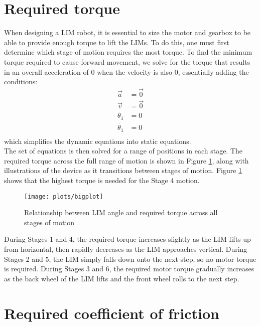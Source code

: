 \section{Required torque}
When designing a LIM robot, it is essential to size the motor and gearbox to be able to provide enough torque to lift the LIMs. To do this, one must first determine which stage of motion requires the most torque. To find the minimum torque required to cause forward movement, we solve for the torque that results in an overall acceleration of 0 when the velocity is also 0, essentially adding the conditions:
\begin{subequations}
	\label{condition-static}
	\begin{align}
		\vec{a} &= \vec{0}\\
		\vec{v} &= \vec{0}\\
		\ddot{\theta_1} &= 0\\
		\dot{\theta_1} &= 0\\
	\end{align}
\end{subequations}
which simplifies the dynamic equations into static equations.\\
The set of equations is then solved for a range of positions in each stage. The required torque across the full range of motion is shown in Figure \ref{fig:bigplot}, along with illustrations of the device as it transitions between stages of motion. Figure \ref{fig:bigplot} shows that the highest torque is needed for the Stage 4 motion.\\


\begin{figure}[h]
	\centering
	\texttt{[image: plots/bigplot]}
	\caption{Relationship between LIM angle and required torque across all stages of motion}
	\label{fig:bigplot}
\end{figure}

During Stages 1 and 4, the required torque increases slightly as the LIM lifts up from horizontal, then rapidly decreases as the LIM approaches vertical. During Stages 2 and 5, the LIM simply falls down onto the next step, so no motor torque is required. During Stages 3 and 6, the required motor torque gradually increases as the back wheel of the LIM lifts and the front wheel rolls to the next step. 

\section{Required coefficient of friction}


